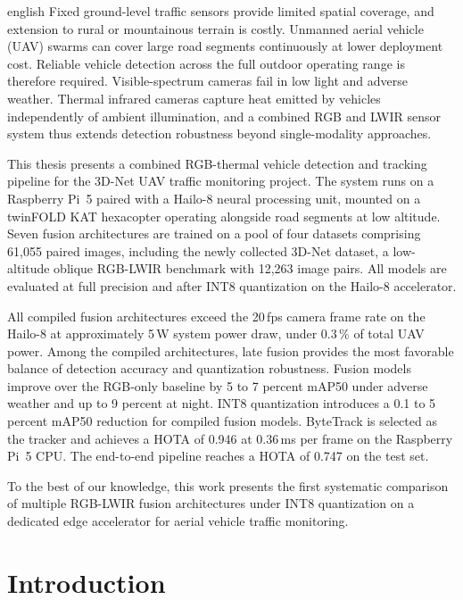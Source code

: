 \documentclass[12pt,oneside,bibtotoc,liststotoc]{scrbook}
\begin{document}
\begin{otherlanguage*}{english}
Fixed ground-level traffic sensors provide limited spatial coverage, and extension to rural
or mountainous terrain is costly. Unmanned aerial vehicle (UAV) swarms can cover large road
segments continuously at lower deployment cost. Reliable vehicle detection across the full
outdoor operating range is therefore required. Visible-spectrum cameras fail in low light and
adverse weather. Thermal infrared cameras capture heat emitted by vehicles independently of
ambient illumination, and a combined RGB and LWIR sensor system thus extends detection
robustness beyond single-modality approaches.

This thesis presents a combined RGB-thermal vehicle detection and tracking pipeline for the
3D-Net UAV traffic monitoring project. The system runs on a Raspberry Pi~5 paired with a
Hailo-8 neural processing unit, mounted on a twinFOLD KAT hexacopter operating alongside
road segments at low altitude. Seven fusion architectures are trained on a pool of four 
datasets comprising 61,055 paired images, including
the newly collected 3D-Net dataset, a low-altitude oblique RGB-LWIR benchmark with 12,263
image pairs. All models are evaluated at full precision and after INT8 quantization on the
Hailo-8 accelerator.

All compiled fusion architectures exceed the 20\,fps camera frame rate on the Hailo-8 at
approximately 5\,W system power draw, under 0.3\,\% of total UAV power. Among the compiled
architectures, late fusion provides the most favorable balance of detection accuracy
and quantization robustness. Fusion models improve over the RGB-only
baseline by 5 to 7 percent mAP50 under adverse weather and up to 9 percent at night. INT8
quantization introduces a 0.1 to 5 percent mAP50 reduction for compiled fusion models.
ByteTrack is selected as the tracker and achieves a HOTA of 0.946 at 0.36\,ms per frame on
the Raspberry Pi~5 CPU. The end-to-end pipeline reaches a HOTA of 0.747 on the test set.

To the best of our knowledge, this work presents the first systematic comparison of multiple
RGB-LWIR fusion architectures under INT8 quantization on a dedicated edge accelerator for
aerial vehicle traffic monitoring.
\end{otherlanguage*}





\chapter{Introduction}
\label{chap:introduction}
\end{document}
